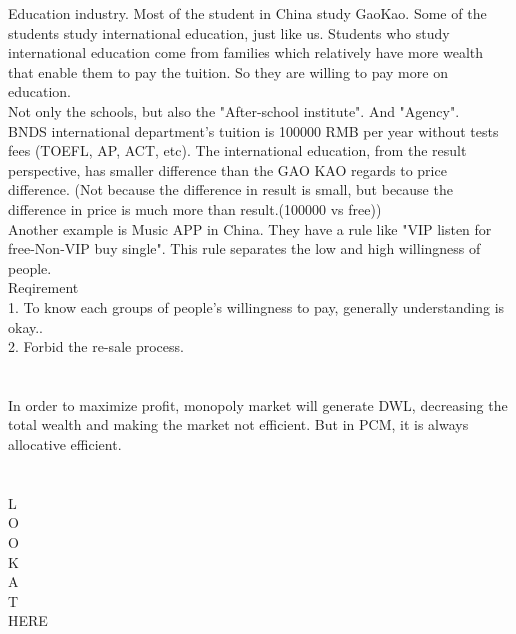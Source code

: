 \documentclass[12pt]{article}
\begin{document}
Education industry. Most of the student in China study GaoKao. Some of the students study international education, just like us. Students who study international education come from families which relatively have more wealth that enable them to pay the tuition. So they are willing to pay more on education.\\
Not only the schools, but also the "After-school institute". And "Agency".\\
BNDS international department's tuition is 100000 RMB per year without tests fees (TOEFL, AP, ACT, etc). The international education, from the result perspective, has smaller difference than the GAO KAO regards to price difference. (Not because the difference in result is small, but because the difference in price is much more than result.(100000 vs free))
\\
Another example is Music APP in China. They have a rule like "VIP listen for free-Non-VIP buy single". This rule separates the low and high willingness of people.
\\
Reqirement\\
1. To know each groups of people's willingness to pay, generally understanding is okay.. \\
2. Forbid the re-sale process. 


\section{}

In order to maximize profit, monopoly market will generate DWL, decreasing the total wealth and making the market not efficient. But in PCM, it is always allocative efficient.

\section{}
L\\
O\\
O\\
K\\
A\\
T\\
HERE
\end{document}
